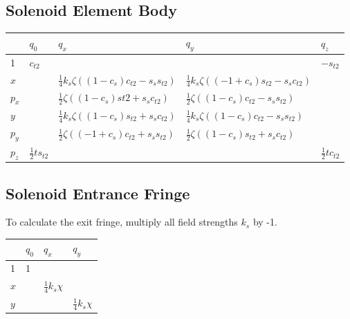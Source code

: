\subsection{Solenoid Element Body}

\begin{center}
\begin{tabular}{lllll} \toprule
  &  $q_0$ & $q_x$ & $q_y$ & $q_z$ \\ \midrule
  1 & $c_{t2}$ & & & $-s_{t2}$ \\ \addlinespace[1ex]
  $x$ & & $\frac{1}{4} k_s \zeta ((1 - c_{s}) c_{t2} - s_{s} s_{t2})$ & $\frac{1}{4} k_s \zeta ((-1 + c_{s}) s_{t2} - s_{s} c_{t2})$ & \\ \addlinespace[1ex]
  $p_x$ & & $\frac{1}{2} \zeta ((1-c_{s}) {st2} + s_{s} c_{t2})$ & $\frac{1}{2} \zeta ((1 - c_{s}) c_{t2} - s_{s} s_{t2})$ & \\ \addlinespace[1ex]
  $y$ & & $\frac{1}{4} k_s \zeta ((1 - c_{s}) s_{t2} + s_{s} c_{t2})$ & $\frac{1}{4} k_s \zeta ((1 - c_{s}) c_{t2} - s_{s} s_{t2})$ &\\ \addlinespace[1ex]
  $p_y$ & & $\frac{1}{2} \zeta ((-1 + c_{s}) c_{t2} + s_{s} s_{t2})$ & $\frac{1}{2} \zeta ((1-c_{s}) s_{t2} + s_{s} c_{t2})$ & \\ \addlinespace[1ex]
  $p_z$ & $\frac{1}{2} {t} s_{t2}$ & & & $\frac{1}{2} {t} c_{t2}$ \\
\bottomrule
\end{tabular}
\end{center}

\subsection{Solenoid Entrance Fringe}
To calculate the exit fringe, multiply all field strengths $k_s$ by -1.
\begin{center}
\begin{tabular}{llll} \toprule
  & $q_0$ & $q_x$ & $q_y$ \\ \midrule
  1 & 1 & & \\
  $x$ & & $\frac{1}{4} k_s \chi $ &  \\
  $y$ & & & $\frac{1}{4} k_s \chi $ \\
\bottomrule
\end{tabular}
\end{center}

